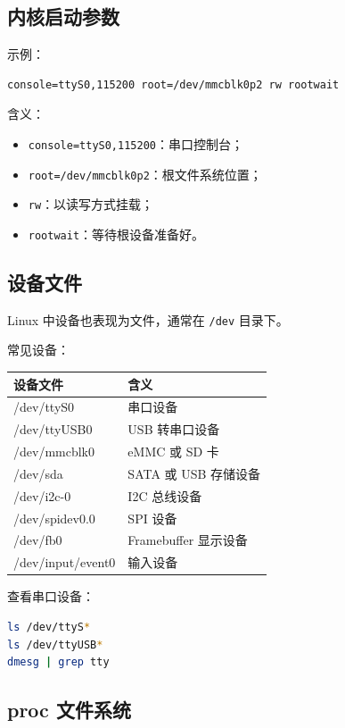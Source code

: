 \documentclass[UTF8,a4paper,12pt]{ctexart}
\begin{document}
\subsection{内核启动参数}

示例：

\begin{lstlisting}
console=ttyS0,115200 root=/dev/mmcblk0p2 rw rootwait
\end{lstlisting}

含义：
\begin{itemize}
    \item \texttt{console=ttyS0,115200}：串口控制台；
    \item \texttt{root=/dev/mmcblk0p2}：根文件系统位置；
    \item \texttt{rw}：以读写方式挂载；
    \item \texttt{rootwait}：等待根设备准备好。
\end{itemize}

\subsection{设备文件}

Linux 中设备也表现为文件，通常在 \texttt{/dev} 目录下。

常见设备：
\begin{longtable}{p{4cm}p{10cm}}
\toprule
设备文件 & 含义 \\
\midrule
/dev/ttyS0 & 串口设备 \\
/dev/ttyUSB0 & USB 转串口设备 \\
/dev/mmcblk0 & eMMC 或 SD 卡 \\
/dev/sda & SATA 或 USB 存储设备 \\
/dev/i2c-0 & I2C 总线设备 \\
/dev/spidev0.0 & SPI 设备 \\
/dev/fb0 & Framebuffer 显示设备 \\
/dev/input/event0 & 输入设备 \\
\bottomrule
\end{longtable}

查看串口设备：

\begin{lstlisting}[language=bash]
ls /dev/ttyS*
ls /dev/ttyUSB*
dmesg | grep tty
\end{lstlisting}

\subsection{proc 文件系统}
\end{document}
